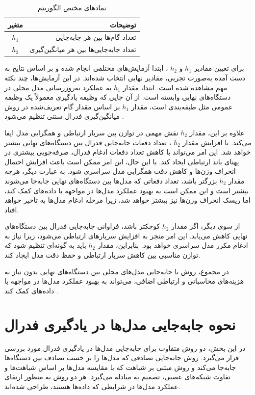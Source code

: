 \begin{table}[h]
	\centering
	\caption{نمادهای مختص الگوریتم
	}
	\label{tabel_FedSwapNotations}
	\begin{tabular}{cr}
		\hline
		متغیر & توضیحات \\
		\hline
		$h_1$ & تعداد گام‌ها بین هر جابه‌جایی \\
		$h_2$ & تعداد جابه‌جایی‌ها بین هر میانگین‌گیری
	\end{tabular}
\end{table}


برای تعیین مقادیر
$h_1$
و
$h_2$%
، ابتدا آزمایش‌های مختلفی انجام شده و بر اساس نتایج به دست آمده به‌صورت تجربی، مقادیر نهایی انتخاب شده‌اند. در این آزمایش‌ها، چند نکته مهم مشاهده شده است. ابتدا، مقدار
$h_1$
به عملکرد به‌روزرسانی مدل محلی در دستگاه‌های نهایی وابسته است. از آن‌ جایی که وظیفه یادگیری معمولاً یک وظیفه عمومی مثل طبقه‌بندی است، مقدار
$h_1$
بر اساس مقدار گام تعریف‌شده در روش میانگین‌گیری فدرال سنتی تنظیم می‌شود
\cite{chiu2020semisupervised}.

علاوه بر این، مقدار
$h_2$
نقش مهمی در توازن بین سربار ارتباطی و همگرایی مدل ایفا می‌کند. با افزایش مقدار
$h_2$%
، تعداد دفعات جابه‌جایی فدرال بین دستگاه‌های نهایی بیشتر خواهد شد. این امر می‌تواند با کاهش تعداد دفعات ادغام فدرال، صرفه‌جویی بیشتری در پهنای باند ارتباطی ایجاد کند. با این حال، این امر ممکن است باعث افزایش احتمال انحراف وزن‌ها و کاهش دقت همگرایی مدل سراسری شود. به عبارت دیگر، هرچه مقدار
$h_2$
بزرگتر باشد، تعداد دفعاتی که مدل‌ها بین دستگاه‌های نهایی جابه‌جا می‌شوند بیشتر است و این ممکن است به بهبود عملکرد مدل‌ها در مواجهه با داده‌های
کمک کند، اما ریسک انحراف وزن‌ها نیز بیشتر خواهد شد، زیرا مرحله ادغام مدل‌ها به تاخیر خواهد افتاد.

از سوی دیگر، اگر مقدار
$h_2$
کوچکتر باشد، فراوانی جابه‌جایی فدرال بین دستگاه‌های نهایی کاهش می‌یابد. این امر منجر به افزایش سربارهای ارتباطی می‌شود، زیرا نیاز به ادغام مکرر مدل سراسری خواهد بود. بنابراین، مقدار
$h_2$
باید به گونه‌ای تنظیم شود که توازن مناسبی بین کاهش سربار ارتباطی و حفظ دقت مدل ایجاد کند.

در مجموع، روش
با جابه‌جایی مدل‌های محلی بین دستگاه‌های نهایی بدون نیاز به هزینه‌های محاسباتی و ارتباطی اضافی، می‌تواند به بهبود عملکرد مدل‌ها در مواجهه با داده‌های
کمک کند
\cite{chiu2020semisupervised}.



\section{نحوه جابه‌جایی مدل‌ها در یادگیری فدرال}
در این بخش، دو روش متفاوت برای جابه‌جایی مدل‌ها در یادگیری فدرال مورد بررسی قرار می‌گیرد. روش جابه‌جایی تصادفی که مدل‌ها را بر حسب تصادف بین دستگاه‌ها جابه‌جا می‌کند و روش مبتنی بر شباهت که با مقایسه مدل‌ها بر اساس شباهت‌ها و تفاوت‌ شبکه‌های عصبی، تصمیم به مبادله می‌گیرد. هر دو روش به منظور ارتقای عملکرد مدل‌ها در شرایطی که داده‌ها
هستند، طراحی شده‌اند.

